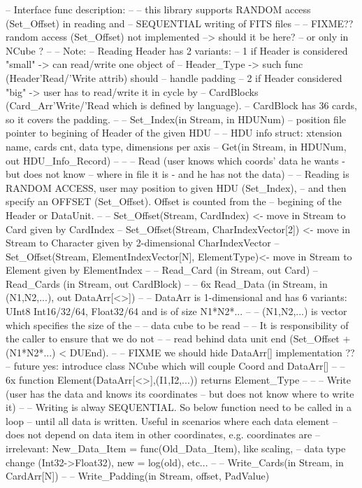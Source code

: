 
-- Interface func description:
--
-- this library supports RANDOM access (Set_Offset) in reading and
-- SEQUENTIAL writing of FITS files
--
-- FIXME?? random access (Set_Offset) not implemented --> should it be here?
--         or only in NCube ?
--
-- Note:
-- Reading Header has 2 variants:
-- 1 if Header is considered "small" -> can read/write one object of
--   Header_Type -> such func (Header'Read/'Write attrib) should
--   handle padding
-- 2 if Header considered "big" -> user has to read/write it in cycle by
--   CardBlocks (Card_Arr'Write/'Read which is defined by language).
--   CardBlock has 36 cards, so it covers the padding.
--
-- Set_Index(in Stream, in HDUNum)
-- position file pointer to begining of Header of the given HDU
--
-- HDU info struct: xtension name, cards cnt, data type, dimensions per axis
-- Get(in Stream, in HDUNum, out HDU_Info_Record)
--
--
-- Read (user knows which coords' data he wants - but does not know
--       where in file it is - and he has not the data)
--
-- Reading is RANDOM ACCESS, user may position to given HDU (Set_Index),
-- and then specify an OFFSET (Set_Offset). Offset is counted from the
-- begining of the Header or DataUnit.
--
-- Set_Offset(Stream, CardIndex)          <- move in Stream to Card given by CardIndex
-- Set_Offset(Stream, CharIndexVector[2]) <- move in Stream to Character given by 2-dimensional CharIndexVector
-- Set_Offset(Stream, ElementIndexVector[N], ElementType)<- move in Stream to Element given by ElementIndex
--
-- Read_Card (in Stream, out Card)
-- Read_Cards (in Stream, out CardBlock)
--
-- 6x Read_Data (in Stream, in (N1,N2,...), out DataArr[<>])
-- -- DataArr is 1-dimensional and has 6 variants: UInt8 Int16/32/64, Float32/64 and is of size N1*N2*...
-- -- (N1,N2,...) is vector which specifies the size of the
-- --  data cube to be read
-- -- It is responsibility of the caller to ensure that we do not
-- -- read behind data unit end (Set_Offset + (N1*N2*...) < DUEnd).
--
-- FIXME we should hide DataArr[] implementation ??
--  future yes: introduce class NCube which will couple Coord and DataArr[]
--
-- 6x function Element(DataArr[<>],(I1,I2,...)) returns Element_Type
--
--
-- Write (user has the data and knows its coordinates
--        but does not know where to write it)
--
-- Writing is alway SEQUENTIAL. So below function need to be called in a loop
-- until all data is written. Useful in scenarios where each data element
-- does not depend on data item in other coordinates, e.g. coordinates are
-- irrelevant: New_Data_Item = func(Old_Data_Item), like scaling,
-- data type change (Int32->Float32), new = log(old), etc...
--
-- Write_Cards(in Stream, in  CardArr[N])
--
-- Write_Padding(in Stream, offset, PadValue)

